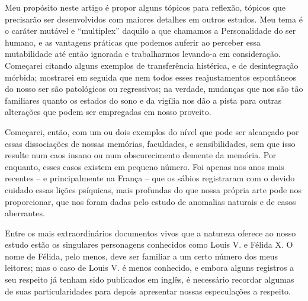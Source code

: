 \clearpage

Meu propósito neste artigo é propor alguns tópicos para reflexão,
tópicos que precisarão ser desenvolvidos com maiores detalhes em outros
estudos. Meu tema é o caráter mutável e “multiplex” daquilo a que
chamamos a Personalidade do ser humano, e as vantagens práticas que
podemos auferir ao perceber essa mutabilidade até então ignorada e
trabalharmos levando-a em consideração.  Começarei citando alguns
exemplos de transferência histérica, e de desintegração mórbida;
mostrarei em seguida que nem todos esses reajustamentos espontâneos do
nosso ser são patológicos ou regressivos; na verdade, mudanças que nos
são tão familiares quanto os estados do sono e da vigília nos dão a
pista para outras alterações que podem ser empregadas em nosso
proveito.

Começarei, então, com um ou dois exemplos do nível que pode ser
alcançado por essas dissociações de nossas memórias, faculdades, e
sensibilidades, sem que isso resulte num caos insano ou num
obscurecimento demente da memória. Por enquanto, esses casos existem em
pequeno número. Foi apenas nos anos mais recentes -- e
principalmente na França -- que os sábios registraram com o devido
cuidado essas lições psíquicas, mais profundas do que nossa própria
arte pode nos proporcionar, que nos foram dadas pelo estudo de
anomalias naturais e de casos aberrantes. 

Entre os mais extraordinários documentos vivos que a natureza oferece ao
nosso estudo estão os singulares personagens conhecidos como Louis V. e
Félida X.  O nome de Félida, pelo menos, deve ser familiar a um certo
número dos meus leitores; mas o caso de Louis V. é menos conhecido, e
embora alguns registros a seu respeito já tenham sido publicados em
inglês, é necessário recordar algumas de suas particularidades para
depois apresentar nossas especulações a respeito.


